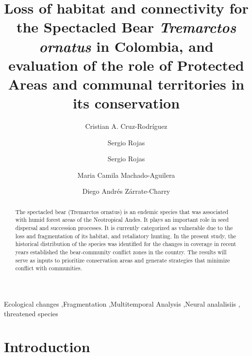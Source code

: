 \documentclass[preprint, 3p,
authoryear]{elsarticle} %
\begin{document}
\begin{frontmatter}

  \title{Loss of habitat and connectivity for the Spectacled Bear
\emph{Tremarctos ornatus} in Colombia, and evaluation of the role of
Protected Areas and communal territories in its conservation}
    \author[UdeM]{Cristian A. Cruz-Rodríguez%
  }
    \author[IAvH]{Sergio Rojas%
  }
    \author[IAvH]{Sergio Rojas%
  }
    \author[ProCAT]{Maria Camila Machado-Aguilera%
  }
    \author[]{Diego Andrés Zárrate-Charry%
  }
  
  \begin{abstract}
  The spectacled bear (Tremarctos ornatus) is an endemic species that
  was associated with humid forest areas of the Neotropical Andes. It
  plays an important role in seed dispersal and succession processes. It
  is currently categorized as vulnerable due to the loss and
  fragmentation of its habitat, and retaliatory hunting. In the present
  study, the historical distribution of the species was identified for
  the changes in coverage in recent years established the bear-community
  conflict zones in the country. The results will serve as inputs to
  prioritize conservation areas and generate strategies that minimize
  conflict with communities.
  \end{abstract}
    \begin{keyword}
    Ecological changes \sep Fragmentation \sep Multitemporal
Analysis \sep Neural analalisiis \sep 
    threatened species
  \end{keyword}
  
 \end{frontmatter}

\hypertarget{introduction}{%
\section{Introduction}\label{introduction}}
\end{document}
